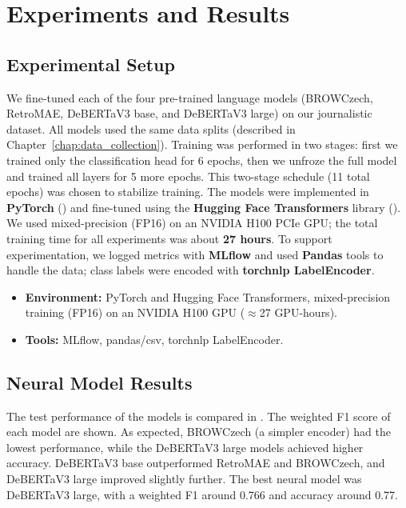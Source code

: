 
\chapter{Experiments and Results\label{chap:experiments}}

\section{Experimental Setup}

We fine-tuned each of the four pre-trained language models (\ac{BROWCzech}, \ac{RetroMAE}, \ac{DeBERTaV3} base, and \ac{DeBERTaV3} large) on our journalistic dataset. All models used the same data splits (described in Chapter~\ref{chap:data_collection}). Training was performed in two stages: first we trained only the classification head for 6 epochs, then we unfroze the full model and trained all layers for 5 more epochs. This two-stage schedule (11 total epochs) was chosen to stabilize training. The models were implemented in \textbf{PyTorch} (\cite{paszke2019pytorch}) and fine-tuned using the \textbf{Hugging Face Transformers} library (\cite{wolf2020transformers}). We used mixed-precision (FP16) on an NVIDIA H100 PCIe GPU; the total training time for all experiments was about \textbf{27 hours}. To support experimentation, we logged metrics with \textbf{MLflow} and used \textbf{Pandas} tools to handle the data; class labels were encoded with \textbf{torchnlp LabelEncoder}.

\begin{itemize}
  \item \textbf{Environment:} PyTorch and Hugging Face Transformers, mixed-precision training (FP16) on an NVIDIA H100 GPU ($\approx$27 GPU-hours).
  \item \textbf{Tools:} MLflow, pandas/csv, torchnlp LabelEncoder.
\end{itemize}

\section{Neural Model Results}

The test performance of the models is compared in . The weighted F1 score of each model are shown. As expected, \ac{BROWCzech} (a simpler encoder) had the lowest performance, while the \ac{DeBERTaV3} large models achieved higher accuracy. \ac{DeBERTaV3} base outperformed \ac{RetroMAE} and \ac{BROWCzech}, and \ac{DeBERTaV3} large improved slightly further. The best neural model was \ac{DeBERTaV3} large, with a weighted F1 around 0.766 and accuracy around 0.77. 

